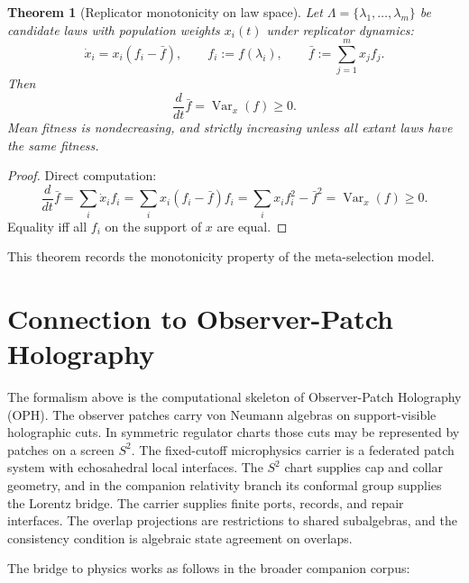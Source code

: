 \documentclass[11pt]{article}
\newtheorem{theorem}{Theorem}[section]
\theoremstyle{remark}
\theoremstyle{plain}
\begin{document}
\begin{theorem}[Replicator monotonicity on law space]\label{thm:replicator}
Let $\Lambda=\{\lambda_1,\dots,\lambda_m\}$ be candidate laws with population weights $x_i(t)$ under replicator dynamics:
\[
\dot{x}_i = x_i(f_i - \bar{f}),
\qquad
f_i := f(\lambda_i),
\qquad
\bar{f} := \sum_{j=1}^m x_j f_j.
\]
Then
\[
\frac{d}{dt}\bar{f} = \operatorname{Var}_x(f) \ge 0.
\]
Mean fitness is nondecreasing, and strictly increasing unless all extant laws have the same fitness.
\end{theorem}

\begin{proof}
Direct computation:
\[
\frac{d}{dt}\bar{f}
=
\sum_i \dot{x}_i f_i
=
\sum_i x_i(f_i - \bar{f})f_i
=
\sum_i x_i f_i^2 - \bar{f}^2
=
\operatorname{Var}_x(f) \ge 0.
\]
Equality iff all $f_i$ on the support of $x$ are equal.
\end{proof}

This theorem records the monotonicity property of the meta-selection model.


\section{Connection to Observer-Patch Holography}

The formalism above is the computational skeleton of Observer-Patch Holography (OPH). The
observer patches carry von Neumann algebras on support-visible holographic cuts. In symmetric
regulator charts those cuts may be represented by patches on a screen \(S^2\). The fixed-cutoff
microphysics carrier is a federated patch system with echosahedral local interfaces. The \(S^2\)
chart supplies cap and collar geometry, and in the companion relativity branch its conformal group
supplies the Lorentz bridge. The carrier supplies finite ports, records, and repair interfaces. The
overlap projections are restrictions to shared subalgebras, and the consistency condition is
algebraic state agreement on overlaps.

The bridge to physics works as follows in the broader companion corpus:
\end{document}
